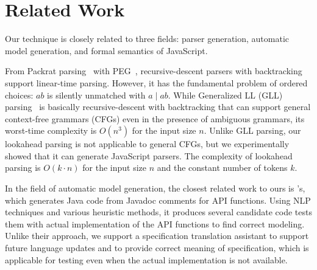 \section{Related Work}\label{sec:related}
Our technique is closely related to three fields: parser generation,
automatic model generation, and formal semantics of JavaScript.

From Packrat parsing~\cite{packrat} with PEG~\cite{peg}, recursive-descent
parsers with backtracking support linear-time parsing.  However, it
has the fundamental problem of ordered choices: \( ab \) is silently
unmatched with \( a \mid ab \).  While Generalized LL (GLL) parsing~\cite{gll}
is basically recursive-descent with backtracking that can support general
context-free grammars (CFGs) even in the presence of ambiguous grammars,
its worst-time complexity is \( O(n^3) \) for the input size \( n \).
Unlike GLL parsing, our lookahead parsing is not applicable to general CFGs,
but we experimentally showed that it can generate JavaScript parsers.
The complexity of lookahead parsing is \( O(k \cdot n) \) for the input size
\( n \) and the constant number of tokens \( k \).

In the field of automatic model generation, the closest related work to
ours is \citet{javadoc}'s, which generates Java code from Javadoc comments
for API functions.  Using NLP techniques and various heuristic methods,
it produces several candidate code tests them with actual implementation
of the API functions to find correct modeling.  Unlike their approach, we
support a specification translation assistant to support future language
updates and to provide correct meaning of specification, which is
applicable for testing even when the actual implementation is not available.






